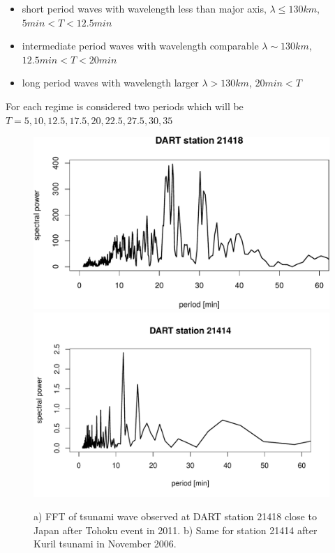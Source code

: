 \begin{itemize}
\item short period waves with wavelength less than major axis, $\lambda \leq 130 km$, $5 min < T < 12.5 min$
\item intermediate period waves with wavelength comparable $\lambda \sim 130 km$, $12.5 min < T < 20 min$
\item long period waves with wavelength larger $\lambda > 130 km$, $20 min < T$
\end{itemize}
For each regime is considered two periods which will be $T = 5, 10, 12.5, 17.5, 20, 22.5, 27.5, 30, 35$
\begin{figure}
\includegraphics[scale=0.5]{../figures/tsunami_spectra.pdf}
\includegraphics[scale=0.5]{../figures/spectra_tsunami_21414.pdf}
\caption{a) FFT of tsunami wave observed at DART station 21418 close to Japan after Tohoku event in 2011. b) Same for station 21414 after Kuril tsunami in November 2006.}
\end{figure}

